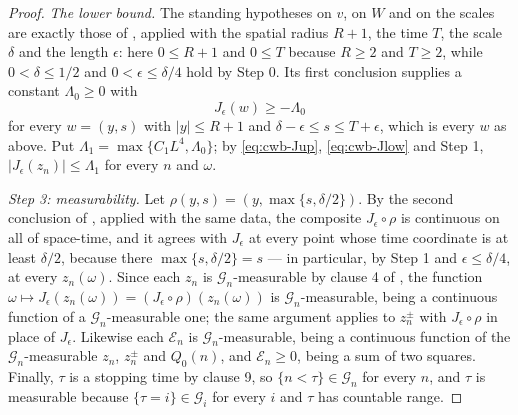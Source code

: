 \begin{proof}
\emph{The lower bound.} The standing hypotheses on $v$, on $W$ and on the
scales are exactly those of , applied with
the spatial radius $R+1$, the time $T$, the scale $\delta$ and the length
$\epsilon$: here $0\le R+1$ and $0\le T$ because $R\ge2$ and $T\ge2$, while
$0<\delta\le1/2$ and $0<\epsilon\le\delta/4$ hold by Step 0. Its first
conclusion supplies a constant $\Lambda_0\ge0$ with
\begin{equation}\label{eq:cwb-Jlow}
  J_\epsilon(w)\ge-\Lambda_0
\end{equation}
for every $w=(y,s)$ with $|y|\le R+1$ and $\delta-\epsilon\le s\le T+\epsilon$,
which is every $w$ as above. Put
$\Lambda_1=\max\{C_1L^4,\Lambda_0\}$; by \eqref{eq:cwb-Jup},
\eqref{eq:cwb-Jlow} and Step 1, $|J_\epsilon(z_n)|\le\Lambda_1$ for every $n$
and $\omega$.

\emph{Step 3: measurability.}
Let $\rho(y,s)=(y,\max\{s,\delta/2\})$. By the second conclusion of
, applied with the same data, the
composite $J_\epsilon\circ\rho$ is continuous on all of space-time, and it
agrees with $J_\epsilon$ at every point whose time coordinate is at least
$\delta/2$, because there $\max\{s,\delta/2\}=s$ --- in particular, by Step 1
and
$\epsilon\le\delta/4$, at every $z_n(\omega)$. Since each $z_n$ is
$\mathcal G_n$-measurable by clause 4 of , the function
$\omega\mapsto J_\epsilon(z_n(\omega))=(J_\epsilon\circ\rho)(z_n(\omega))$ is
$\mathcal G_n$-measurable, being a continuous function of a
$\mathcal G_n$-measurable one; the same argument applies to $z^\pm_n$ with
$J_\epsilon\circ\rho$ in place of $J_\epsilon$. Likewise each $\mathcal E_n$ is
$\mathcal G_n$-measurable, being a continuous function of the
$\mathcal G_n$-measurable $z_n$, $z^\pm_n$ and $Q_0(n)$, and
$\mathcal E_n\ge0$, being a sum of two squares. Finally, $\tau$ is a stopping
time by clause 9, so $\{n<\tau\}\in\mathcal G_n$ for every $n$, and $\tau$ is
measurable because $\{\tau=i\}\in\mathcal G_i$ for every $i$ and $\tau$ has
countable range.


\end{proof}
